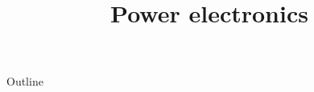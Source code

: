 \documentclass{../course_template/lectureClass}
\begin{document}
\title[Power electronics]{Power electronics}
\date{}
\begin{frame}[plain]
    \titlepage
\end{frame}

\begin{frame}{Outline}
    \tableofcontents
\end{frame}



\end{document}
